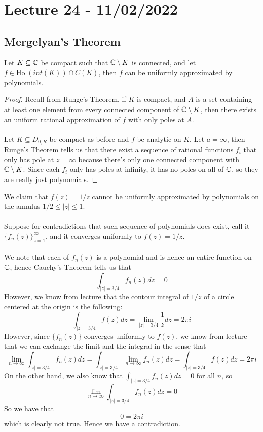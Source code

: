 \section{Lecture 24 - 11/02/2022}

\subsection{Mergelyan's Theorem}
\begin{theorem}
    Let $K \subseteq \mathbb{C}$ be compact such that $\mathbb{C} \setminus K$ is connected, and let $f \in \text{Hol}(int(K)) \cap C(K)$, then $f$ can be uniformly approximated by polynomials.
\end{theorem}

\begin{proof}
Recall from Runge's Theorem, if $K$ is compact, and $A$ is a set containing at least one element from every connected component of $\mathbb{C} \setminus K$, then there exists an uniform rational approximation of $f$ with only poles at $A$.\\\\
Let $K \subseteq D_{0, R}$ be compact as before and $f$ be analytic on $K$. Let $a = \infty$, then Runge's Theorem tells us that there exist a sequence of rational functions $f_i$ that only has pole at $z = \infty$ because there's only one connected component with $\mathbb{C} \setminus K$. Since each $f_i$ only has poles at infinity, it has no poles on all of $\mathbb{C}$, so they are really just polynomials.
\end{proof}

\begin{example}
  We claim that $f(z) = 1/z$ cannot be uniformly approximated by polynomials on the annulus $1/2 \leq |z| \leq 1$.\\\\
Suppose for contradictions that such sequence of polynomials does exist, call it $\{f_n(z)\}_{z=1}^\infty$, and it converges uniformly to $f(z) = 1/z$.\\\\
    We note that each of $f_n(z)$ is a polynomial and is hence an entire function on $\mathbb{C}$, hence Cauchy's Theorem tells us that
    \[\int_{|z| = 3/4} f_n(z) dz = 0\]
    However, we know from lecture that the contour integral of $1/z$ of a circle centered at the origin is the following:
    \[\int_{|z| = 3/4} f(z) dz = \lim_{|z| = 3/4} \frac{1}{z} dz = 2\pi i\]
    However, since $\{f_n(z)\}$ converges uniformly to $f(z)$, we know from lecture that we can exchange the limit and the integral in the sense that
    \[\lim_{n \to \infty} \int_{|z| = 3/4} f_n(z) dz = \int_{|z| = 3/4} \lim_{n \to \infty} f_n(z) dz = \int_{|z| = 3/4} f(z) dz = 2\pi i\]
    On the other hand, we also know that $\int_{|z| = 3/4} f_n(z) dz = 0$ for all $n$, so
    \[\lim_{n \to \infty} \int_{|z| = 3/4} f_n(z) dz = 0\]
    So we have that
    \[0 = 2\pi i\]
    which is clearly not true. Hence we have a contradiction.  
\end{example}

